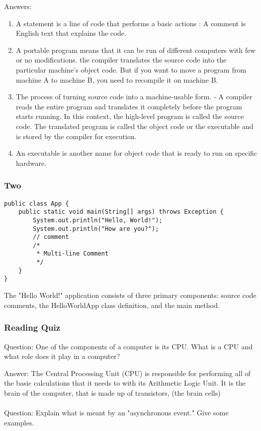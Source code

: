 \documentclass{article}
\begin{document}
Answers:
\begin{enumerate}
\item A statement is a line of code that performs a basic actions : A comment is English text that explains the code.
\item A portable program means that it can be run of different computers with few or no modifications. the compiler translates the source code into the particular machine’s object code. But if you want to move a program from machine A to machine B, you need to recompile it on machine B.
\item The process of turning source code into a machine-usable form. - A compiler reads the entire program and translates it completely before the program starts running. In this context, the high-level program is called the source code. The translated program is called the object code or the executable and is stored by the compiler for execution.
\item An executable is another name for object code that is ready to run on specific hardware.
\end{enumerate}

\subsubsection{Two}

\begin{lstlisting}
public class App {
    public static void main(String[] args) throws Exception {
        System.out.println("Hello, World!");
        System.out.println("How are you?");
        // comment
        /*
         * Multi-line Comment
         */
    }
}
\end{lstlisting}

The "Hello World!" application consists of three primary components: source code comments, the HelloWorldApp class definition, and the main method.

\subsubsection{Reading Quiz}

Question: One of the components of a computer is its CPU. What is a CPU and what role does it play in a computer?

Answer: The Central Processing Unit (CPU) is responsible for performing all of the basic calculations that it needs to with its Arithmetic Logic Unit. It is the brain of the computer, that is made up of transistors, (the brain cells)
\\
\\
Question: Explain what is meant by an "asynchronous event." Give some examples.
\end{document}
